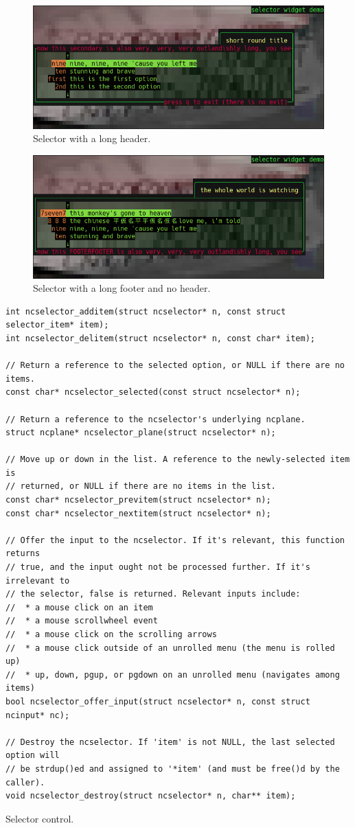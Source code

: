 \documentclass[letterpaper,10pt]{article}
\begin{document}
\begin{figure}[!htb]
  \centering \includegraphics[width=.75\linewidth]{media/selector3.png}
    \caption{Selector with a long header.}
\end{figure}

\begin{figure}[!htb]
\centering \includegraphics[width=.75\linewidth]{media/selector4.png}
\caption{Selector with a long footer and no header.}
\end{figure}

\begin{listing}[!htb]
\begin{verbatim}
int ncselector_additem(struct ncselector* n, const struct selector_item* item);
int ncselector_delitem(struct ncselector* n, const char* item);

// Return a reference to the selected option, or NULL if there are no items.
const char* ncselector_selected(const struct ncselector* n);

// Return a reference to the ncselector's underlying ncplane.
struct ncplane* ncselector_plane(struct ncselector* n);

// Move up or down in the list. A reference to the newly-selected item is
// returned, or NULL if there are no items in the list.
const char* ncselector_previtem(struct ncselector* n);
const char* ncselector_nextitem(struct ncselector* n);

// Offer the input to the ncselector. If it's relevant, this function returns
// true, and the input ought not be processed further. If it's irrelevant to
// the selector, false is returned. Relevant inputs include:
//  * a mouse click on an item
//  * a mouse scrollwheel event
//  * a mouse click on the scrolling arrows
//  * a mouse click outside of an unrolled menu (the menu is rolled up)
//  * up, down, pgup, or pgdown on an unrolled menu (navigates among items)
bool ncselector_offer_input(struct ncselector* n, const struct ncinput* nc);

// Destroy the ncselector. If 'item' is not NULL, the last selected option will
// be strdup()ed and assigned to '*item' (and must be free()d by the caller).
void ncselector_destroy(struct ncselector* n, char** item);
\end{verbatim}
\caption{Selector control.}
\end{listing}
\end{document}
